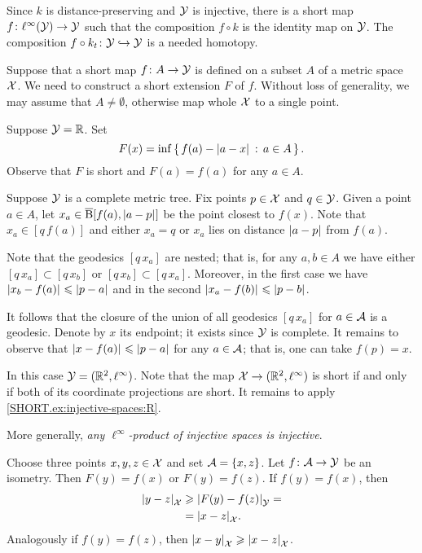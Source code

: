 Since $k$ is distance-preserving and $\mathcal{Y}$ is injective,
there is a short map $f\colon\ell^\infty(\mathcal{Y})\to \mathcal{Y}$ such that the composition $f\circ k$ is the identity map on $\mathcal{Y}$.
The composition $f\circ k_t\colon\mathcal{Y}\hookrightarrow \mathcal{Y}$ is a needed homotopy. 

Suppose that a short map $f\colon A\to\mathcal{Y}$ is defined on a subset $A$ of a metric space $\mathcal{X}$.
We need to construct a short extension $F$ of $f$.
Without loss of generality, we may assume that $A\ne\emptyset$, otherwise map whole $\mathcal{X}$ to a single point.

Suppose $\mathcal{Y}=\mathbb{R}$.
Set 
\[F(x)=\inf\set{f(a)-\dist{a}{x}{}}{a\in A}.\] 
Observe that $F$ is short and $F(a)=f(a)$ for any $a\in A$.

Suppose  $\mathcal{Y}$ is a complete metric tree.
Fix points $p\in \mathcal{X}$ and $q\in\mathcal{Y}$.
Given a point $a\in A$,
let $x_a\in\cBall[f(a),\dist{a}{p}{}]$ be the point closest to $f(x)$.
Note that $x_a\in[q\,f(a)]$ and either $x_a=q$ or $x_a$ lies on distance $\dist{a}{p}{}$ from $f(a)$.

Note that the geodesics $[q\,x_a]$ are nested;
that is, for any $a,b\in A$ we have either $[q\,x_a]\subset [q\,x_b]$ or $[q\,x_b]\subset [q\,x_a]$.
Moreover, in the first case we have $\dist{x_b}{f(a)}{}\le \dist{p}{a}{}$ and in the second $\dist{x_a}{f(b)}{}\le \dist{p}{b}{}$.

It follows that the closure of the union of all geodesics $[q\,x_a]$ for $a\in\mathcal{A}$ is a geodesic.
Denote by $x$ its endpoint; it exists since $\mathcal{Y}$ is complete.
It remains to observe that $\dist{x}{f(a)}{}\le \dist{p}{a}{}$ for any $a\in\mathcal{A}$;
that is, one can take $f(p)=x$.

In this case $\mathcal{Y}=(\mathbb{R}^2,\ell^\infty)$.
Note that the map $\mathcal{X}\to (\mathbb{R}^2,\ell^\infty)$ is short if and only if both of its coordinate projections are short.
It remains to apply \ref{SHORT.ex:injective-spaces:R}.

More generally, \emph{any $\ell^\infty$-product of injective spaces is injective}.


Choose three points $x,y,z\in\mathcal{X}$ and set $\mathcal{A}=\{x,z\}$.
Let $f\colon\mathcal{A}\to \mathcal{Y}$ be an isometry.
Then $F(y)=f(x)$ or $F(y)=f(z)$.
If  $f(y)=f(x)$, then
\begin{align*}
\dist{y}{z}{\spc{X}}&\ge  \dist{F(y)}{f(z)}{\spc{Y}}=
\\
 &=\dist{x}{z}{\spc{X}}.
\end{align*}
Analogously if $f(y)=f(z)$, then $\dist{x}{y}{\spc{X}}\ge\dist{x}{z}{\spc{X}}$.

